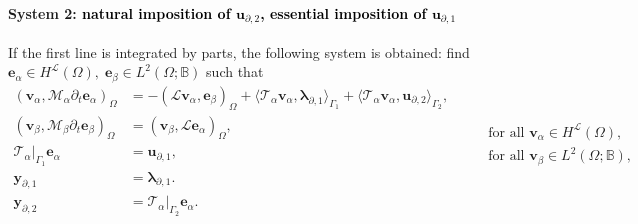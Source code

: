 \documentclass[11pt,a4paper]{article}
\newcommand{\innerproduct}[3][\Omega]{(#2, #3)_{#1}}
\newcommand{\boundary}[3][\partial\Omega]{\langle #2, #3\rangle_{#1}}
\newcommand{\revone}[1]{{\textcolor{black}{#1}}}
\begin{document}
\paragraph{System 2: \revone{natural imposition of $\bm{u}_{\partial, 2}$, essential imposition of $\bm{u}_{\partial, 1}$}}
If the first line is integrated by parts, the following system is obtained: find $\bm{e}_{\alpha} \in H^\mathcal{L}(\Omega), \; \bm{e}_\beta \in L^2(\Omega; \mathbb{B})$ such that
\begin{equation}
    \begin{aligned}
        \innerproduct{\bm{v}_{\alpha}}{\mathcal{M}_\alpha \partial_t\bm{e}_{\alpha}} &= -\innerproduct{\mathcal{L}\bm{v}_{\alpha}}{\bm{e}_{\beta}} + \boundary[\Gamma_1]{\mathcal{T}_{\alpha}\bm{v}_{\alpha}}{\bm{\lambda}_{\partial, 1}} + \boundary[\Gamma_2]{\mathcal{T}_{\alpha}\bm{v}_{\alpha}}{\bm{u}_{\partial, 2}}, \\
        \innerproduct{\bm{v}_{\beta}}{\mathcal{M}_\beta \partial_t\bm{e}_{\beta}} &= \innerproduct{\bm{v}_{\beta}}{\mathcal{L}\bm{e}_{\alpha}}, \\
        \mathcal{T}_{\alpha}|_{\Gamma_1}\bm{e}_{\alpha} &= \bm{u}_{\partial, 1}, \\
        \bm{y}_{\partial, 1} &= \bm{\lambda}_{\partial,1}. \\
        \bm{y}_{\partial, 2} &= \mathcal{T}_\alpha|_{\Gamma_2} \bm{e}_{\alpha}. \\
    \end{aligned} \qquad
    \begin{aligned}
        \text{for all } \bm{v}_{\alpha}  \in H^\mathcal{L}(\Omega), \\
        \text{for all } \bm{v}_{\beta} \in L^2(\Omega; \mathbb{B}), \\
        {} \\ {} \\ {}
    \end{aligned}
    \label{eq:weak_conforming_L*}
\end{equation}
\end{document}
